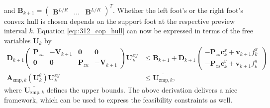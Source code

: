 and $\bm{B}_{k+1}=\begin{pmatrix} \bm{B}^{L/R} & \dots & \bm{B}^{L/R}\end{pmatrix}^T$. Whether the left foot's or the right foot's convex hull is chosen depends on the support foot at the respective preview interval $k$. Equation \ref{eq::312_cop_hull} can now be expressed in terms of the free variables $\bm{U}_k$ by
\begin{align}
	\bm{D}_{k+1}\begin{pmatrix}
		\bm{P}_{zu} & -\bm{V}_{k+1} & \bm{0} & \bm{0}\\
		\bm{0} & \bm{0} & \bm{P}_{zu} & -\bm{V}_{k+1}
	\end{pmatrix}\bm{U}_k^{xy} &\leq \bm{B}_{k+1} + \bm{D}_{k+1}\begin{pmatrix}
		-\bm{P}_{zs}\bm{c}_k^x + \bm{v}_{k+1}f_k^x\\
		-\bm{P}_{zs}\bm{c}_k^y + \bm{v}_{k+1}f_k^y
	\end{pmatrix} \\
	\bm{A}_{\text{zmp},k}(\bm{U}_k^\theta)\bm{U}_k^{xy} &\leq \overline{\bm{U}_{\text{zmp},k}},
	\label{eq::312_ineq_zmp}
\end{align}
where $\overline{\bm{U}_{\text{zmp},k}}$ defines the upper bounds. The above derivation delivers a nice framework, which can be used to express the feasibility constraints as well.
